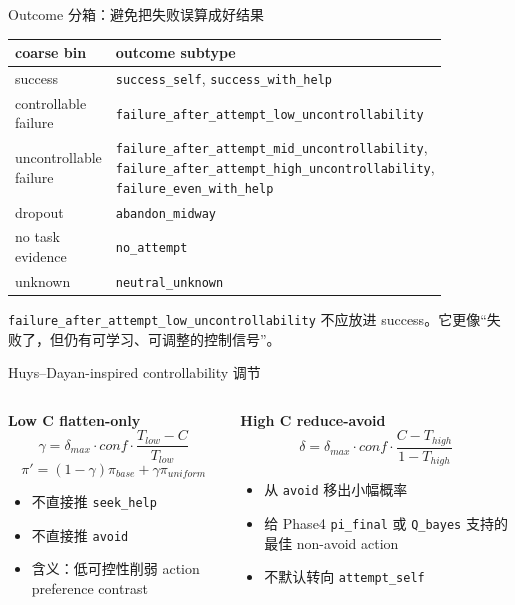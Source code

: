 \documentclass[aspectratio=169]{beamer}
\begin{document}
\begin{frame}[t]{Outcome 分箱：避免把失败误算成好结果}
\small
\centering
\renewcommand{\arraystretch}{1.13}
\begin{tabular}{@{}L{0.28\linewidth}L{0.58\linewidth}@{}}
\toprule
coarse bin & outcome subtype \\
\midrule
success & \texttt{success\_self}, \texttt{success\_with\_help} \\
controllable failure & \texttt{failure\_after\_attempt\_low\_uncontrollability} \\
uncontrollable failure & \texttt{failure\_after\_attempt\_mid\_uncontrollability}, \texttt{failure\_after\_attempt\_high\_uncontrollability}, \texttt{failure\_even\_with\_help} \\
dropout & \texttt{abandon\_midway} \\
no task evidence & \texttt{no\_attempt} \\
unknown & \texttt{neutral\_unknown} \\
\bottomrule
\end{tabular}

\vspace{0.35cm}
\begin{minipage}{0.86\textwidth}
\justifying
\texttt{failure\_after\_attempt\_low\_uncontrollability} 不应放进 success。它更像“失败了，但仍有可学习、可调整的控制信号”。
\end{minipage}
\end{frame}

\begin{frame}[t]{Huys--Dayan-inspired controllability 调节}
\small
\begin{columns}[T]
\begin{column}{0.50\textwidth}
\textbf{Low C flatten-only}
\[
\gamma=\delta_{max}\cdot conf\cdot\frac{T_{low}-C}{T_{low}}
\]
\[
\pi'=(1-\gamma)\pi_{base}+\gamma\pi_{uniform}
\]
\begin{itemize}
    \item 不直接推 \texttt{seek\_help}
    \item 不直接推 \texttt{avoid}
    \item 含义：低可控性削弱 action preference contrast
\end{itemize}
\end{column}

\begin{column}{0.46\textwidth}
\textbf{High C reduce-avoid}
\[
\delta=\delta_{max}\cdot conf\cdot\frac{C-T_{high}}{1-T_{high}}
\]
\begin{itemize}
    \item 从 \texttt{avoid} 移出小幅概率
    \item 给 Phase4 \texttt{pi\_final} 或 \texttt{Q\_bayes} 支持的最佳 non-avoid action
    \item 不默认转向 \texttt{attempt\_self}
\end{itemize}
\end{column}
\end{columns}
\end{frame}
\end{document}

